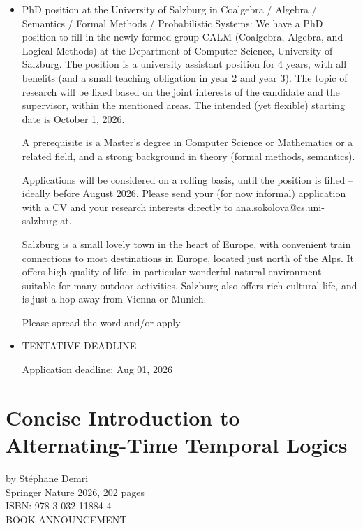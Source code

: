 \documentclass[prodmode,acmtecs]{acmsmall} %
\begin{document}
\begin{itemize}\item  PhD position at the University of Salzburg in Coalgebra / Algebra / Semantics / Formal Methods / Probabilistic Systems: We have a PhD position to fill in the newly formed group CALM (Coalgebra, Algebra, and Logical Methods) at the Department of Computer Science, University of Salzburg. The position is a university assistant position for 4 years, with all benefits (and a small teaching obligation in year 2 and year 3). The topic of research will be fixed based on the joint interests of the candidate and the supervisor, within the mentioned areas. The intended (yet flexible) starting date is October 1, 2026.  
 
  A prerequisite is a Master's degree in Computer Science or Mathematics or a related field, and a strong background in theory (formal methods, semantics).   
 
  Applications will be considered on a rolling basis, until the position is filled -- ideally before August 2026. Please send your (for now informal) application with a CV and your research interests directly to ana.sokolova@cs.uni-salzburg.at. 
 
  Salzburg is a small lovely town in the heart of Europe, with convenient train connections to most destinations in Europe, located just north of the Alps. It offers high quality of life, in particular wonderful natural environment suitable for many outdoor activities. Salzburg also offers rich cultural life, and is just a hop away from Vienna or Munich.  
 
  Please spread the word and/or apply. 
 
\item  TENTATIVE DEADLINE 
 
Application deadline: Aug 01, 2026 
 
\end{itemize}\section{Concise Introduction to Alternating-Time Temporal Logics}\label{ConciseIntroductiontoAlternatingTimeTemporalLogics}  by Stéphane Demri\\ 
  Springer Nature 2026, 202 pages\\ 
  ISBN: 978-3-032-11884-4\\ 
BOOK ANNOUNCEMENT  
\end{document}
